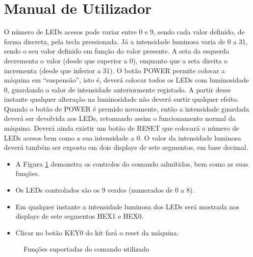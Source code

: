 \documentclass[a4paper,11pt,openright,oneside]{report}
\begin{document}
\section{Manual de Utilizador}
\label{sec:Manual}

O número de LEDs acesos pode variar entre 0 e 9, sendo cada valor definido, de forma discreta, pela tecla pressionada. Já a intensidade luminosa varia de 0 a 31, sendo o seu valor definido em função do valor presente. A seta da esquerda decrementa o valor (desde que superior a 0), enquanto que a seta direita o incrementa (desde que inferior a 31). O botão POWER permite colocar a máquina em ``suspensão'', isto é, deverá colocar todos os LEDs com luminosidade 0, guardando o valor de intensidade anteriormente registado. A partir desse instante qualquer alteração na luminosidade não deverá surtir qualquer efeito. Quando o botão de POWER é premido novamente, então a intensidade guardada deverá ser devolvida aos LEDs, retomando assim o funcionamento normal da máquino. Deverá ainda existir um botão de RESET que colocará o número de LEDs acesos bem como a sua intensidade a 0. O valor da intensidade luminosa deverá também ser exposto em dois displays de sete segmentos, em base decimal.

\begin{itemize}
\item A Figura \ref{fig:ir_leds0} demonstra os controlos do comando admitidos, bem como as suas funções.
\item Os LEDs controlados são os 9 verdes (numerados de 0 a 8).
\item Em qualquer instante a intensidade luminosa dos LEDs será mostrada nos displays de sete segmentos HEX1 e HEX0.
\item Clicar no botão KEY0 do kit fará o reset da máquina.
\end{itemize}

\begin{figure}[ht]
\center
{}
\caption{Funções suportadas do comando utilizado}
\label{fig:ir_leds0}
\end{figure}

\maketitle
\nocite{*}
\end{document}
